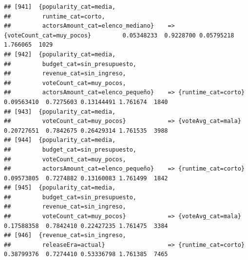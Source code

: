 \documentclass[
]{article}
\begin{document}
\begin{verbatim}
## [941]  {popularity_cat=media,                                                                                                   
##         runtime_cat=corto,                                                                                                      
##         actorsAmount_cat=elenco_mediano}    => {voteCount_cat=muy_pocos}         0.05348233  0.9228700 0.05795218 1.766065  1029
## [942]  {popularity_cat=media,                                                                                                   
##         budget_cat=sin_presupuesto,                                                                                             
##         revenue_cat=sin_ingreso,                                                                                                
##         voteCount_cat=muy_pocos,                                                                                                
##         actorsAmount_cat=elenco_pequeño}    => {runtime_cat=corto}               0.09563410  0.7275603 0.13144491 1.761674  1840
## [943]  {popularity_cat=media,                                                                                                   
##         voteCount_cat=muy_pocos}            => {voteAvg_cat=mala}                0.20727651  0.7842675 0.26429314 1.761535  3988
## [944]  {popularity_cat=media,                                                                                                   
##         budget_cat=sin_presupuesto,                                                                                             
##         voteCount_cat=muy_pocos,                                                                                                
##         actorsAmount_cat=elenco_pequeño}    => {runtime_cat=corto}               0.09573805  0.7274882 0.13160083 1.761499  1842
## [945]  {popularity_cat=media,                                                                                                   
##         budget_cat=sin_presupuesto,                                                                                             
##         revenue_cat=sin_ingreso,                                                                                                
##         voteCount_cat=muy_pocos}            => {voteAvg_cat=mala}                0.17588358  0.7842410 0.22427235 1.761475  3384
## [946]  {revenue_cat=sin_ingreso,                                                                                                
##         releaseEra=actual}                  => {runtime_cat=corto}               0.38799376  0.7274410 0.53336798 1.761385  7465

\end{verbatim}
\end{document}
